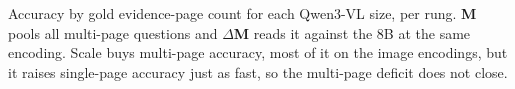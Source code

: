 \begin{table}[t]
\caption{Accuracy by gold evidence-page count for each Qwen3-VL size, per rung. \textbf{M} pools all multi-page questions and $\Delta$\textbf{M} reads it against the 8B at the same encoding. Scale buys multi-page accuracy, most of it on the image encodings, but it raises single-page accuracy just as fast, so the multi-page deficit does not close.}
\label{tab:reasoner_hop}
\end{table}
